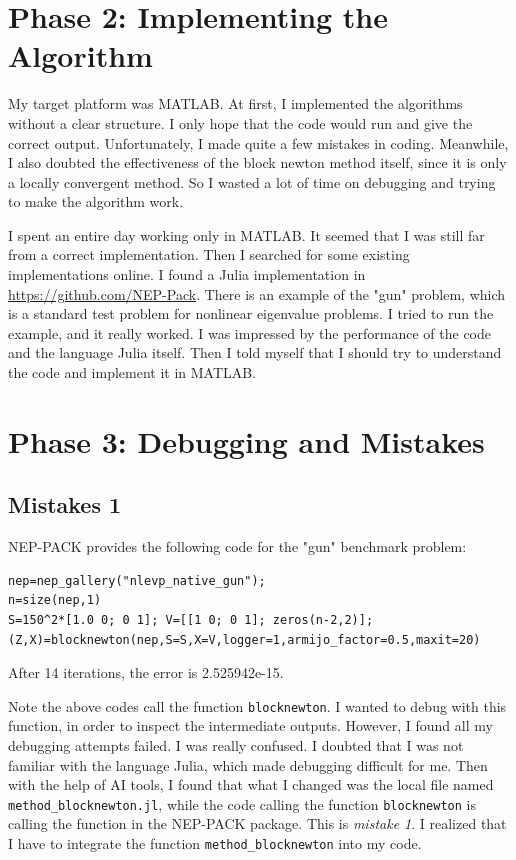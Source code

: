 \documentclass[11pt,a4paper]{article}
\begin{document}
\section{Phase 2: Implementing the Algorithm}
My target platform was MATLAB. At first, I implemented the algorithms without a clear structure.
I only hope that the code would run and give the correct output. Unfortunately, I made quite a few mistakes in coding.
Meanwhile, I also doubted the effectiveness of the block newton method itself, since it is only a locally convergent method.
So I wasted a lot of time on debugging and trying to make the algorithm work. 

I spent an entire day working only in MATLAB. It seemed that I was still far from a correct implementation. 
Then I searched for some existing implementations online. I found a Julia implementation in \url{https://github.com/NEP-Pack}. 
There is an example of the "gun" problem, which is a standard test problem for nonlinear eigenvalue problems.
I tried to run the example, and it really worked. 
I was impressed by the performance of the code and the language Julia itself.
Then I told myself that I should try to understand the code and implement it in MATLAB. 



\section{Phase 3: Debugging and Mistakes}
\subsection{Mistakes 1}
NEP-PACK provides the following code for the "gun" benchmark problem:
\begin{lstlisting}[caption={Example code listing.}]
nep=nep_gallery("nlevp_native_gun");
n=size(nep,1)
S=150^2*[1.0 0; 0 1]; V=[[1 0; 0 1]; zeros(n-2,2)];
(Z,X)=blocknewton(nep,S=S,X=V,logger=1,armijo_factor=0.5,maxit=20)
\end{lstlisting}
After 14 iterations, the error is 2.525942e-15.

Note the above codes call the function \verb|blocknewton|. I wanted to debug with this function, in order to inspect the intermediate outputs. However, I found all my debugging attempts failed.
I was really confused. I doubted that I was not familiar with the language Julia, which made debugging difficult for me. 
Then with the help of AI tools, I found that what I changed was the local file named \verb|method_blocknewton.jl|, 
while the code calling the function \verb|blocknewton| is calling the function in the NEP-PACK package.
This is \emph{mistake 1}. I realized that I have to integrate the function \verb|method_blocknewton| into my code.
\end{document}
